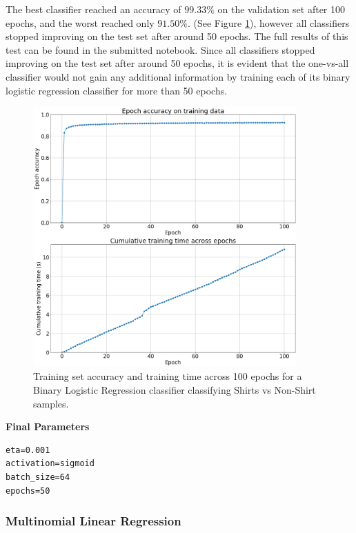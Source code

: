 \documentclass[11pt,a4paper]{article}
\begin{document}
\noindent The best classifier reached an accuracy of $99.33\%$ on the validation set after 100 epochs, and the worst reached only $91.50\%$. (See Figure \ref{fig:worst_lr_binary_classifier_100_epochs}), however all classifiers stopped improving on the test set after around 50 epochs. The full results of this test can be found in the submitted notebook. Since all classifiers stopped improving on the test set after around 50 epochs, it is evident that the one-vs-all classifier would not gain any additional information by training each of its binary logistic regression classifier for more than 50 epochs.\\

\begin{figure}[H]
    \centering
    \includegraphics[width=0.9\textwidth]{img/worst_lr_epoch_test.png}
    \caption{Training set accuracy and training time across 100 epochs for a Binary Logistic Regression classifier classifying Shirts vs Non-Shirt samples.}
    \label{fig:worst_lr_binary_classifier_100_epochs}
\end{figure}

\noindent\textbf{Final Parameters}
\begin{verbatim}
eta=0.001
activation=sigmoid
batch_size=64
epochs=50
\end{verbatim}

\pagebreak

\subsubsection*{Multinomial Linear Regression}
\end{document}
